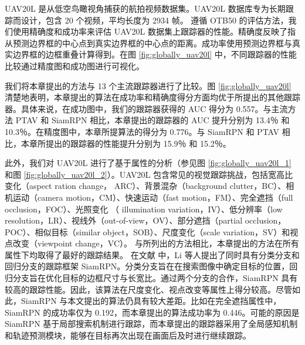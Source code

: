 UAV20L \cite{mueller2016benchmark} 是从低空鸟瞰视角捕获的航拍视频数据集。UAV20L 数据库专为长期跟踪而设计，包含 20 个视频，平均长度为 2934 帧。
遵循 OTB50 \cite{OTB} 的评估方法，我们使用精确度和成功率来评估 UAV20L 数据集上跟踪器的性能。精确度反映了指从预测边界框的中心点到真实边界框的中心点的距离。成功率使用预测边界框与真实边界框的边框重叠计算得到。在图 \ref{fig:globally_uav20l} 中，不同跟踪器的性能比较通过精度图和成功图进行可视化。

我们将本章提出的方法与 13 个主流跟踪器进行了比较。图 \ref{fig:globally_uav20l} 清楚地表明，本章提出的算法在成功率和精确度得分方面均优于所提出的其他跟踪器。具体来说，在成功图中，我们的跟踪器获得的 AUC 得分为 0.557。与主流方法 PTAV \cite{fan2018parallel} 和 SiamRPN \cite{SiamRPN} 相比，本章提出的跟踪器的 AUC 提升分别为 13.4％ 和 10.3％。在精度图中，本章所提算法的得分为 0.776。与 SiamRPN \cite{SiamRPN} 和 PTAV \cite{fan2018parallel} 相比，本章所提出的跟踪器的性能提升分别为 15.9％ 和 15.2％。

此外，我们对 UAV20L 进行了基于属性的分析（参见图 \ref{fig:globally_uav20l_1} 和图 \ref{fig:globally_uav20l_2}）。UAV20L 包含常见的视觉跟踪挑战，包括宽高比变化（aspect ration change，
ARC）、背景混杂（background clutter，BC）、相机运动（camera motion，CM）、快速运动（fast motion，FM）、完全遮挡（full occlusion，FOC）、光照变化
（
illumination variation，IV）、低分辨率（low resolution，LR）、视线外（out-of-view，OV）、部分遮挡（partial occlusion，POC）、相似目标（similar object，SOB）、尺度变化（scale variation，SV）和视点改变（viewpoint change，VC）。
与所列出的方法相比，本章提出的方法在所有属性下均取得了最好的跟踪结果。
在文献 \cite{SiamRPN} 中，Li 等人提出了同时具有分类分支和回归分支的跟踪框架 SiamRPN。分类分支旨在在搜索图像中确定目标的位置，回归分支旨在优化目标的边框尺寸与长宽比。通过两个分支的合作，SiamRPN 具有较高的跟踪性能。因此，该算法在尺度变化、视点改变等属性上得分较高。尽管如此，SiamRPN 与本文提出的算法仍具有较大差距。比如在完全遮挡属性中，SiamRPN 的成功率仅为 0.192，而本章提出的算法成功率为 0.446。可能的原因是 SiamRPN 基于局部搜索机制进行跟踪，而本章提出的跟踪器采用了全局感知机制和轨迹预测模块，能够在目标再次出现在画面后及时进行继续跟踪。

